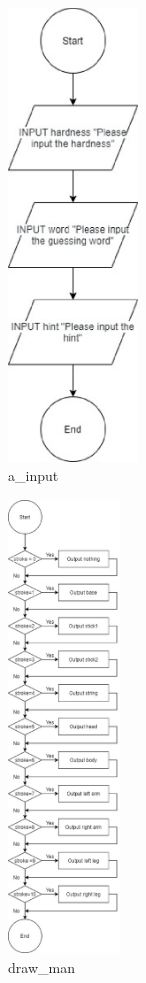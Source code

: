 \documentclass{article}
\begin{document}
        \begin{figure}[htbp]
            \centering
            \includegraphics[height = 12cm]{flowchart/a_input.eps}
            \caption{a\_input}
        \end{figure}

        \begin{figure}[htbp]
            \centering
            \includegraphics[height = 12cm]{flowchart/draw_man.eps}
            \caption{draw\_man}
        \end{figure}
        
\end{document}
